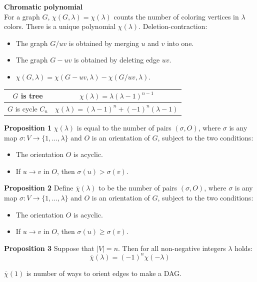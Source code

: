 \textbf{\large{Chromatic polynomial}}\\
For a graph $G$, $\chi(G, \lambda) = \chi(\lambda)$ counts the number of coloring vertices in $\lambda$ colors.
There is a unique polynomial $\chi(\lambda)$. Deletion-contraction:
\begin{itemize}
\item The graph $G/uv$ is obtained by merging $u$ and $v$ into one. 
\item The graph $G - uv$ is obtained by deleting edge $uv$.
\item $\chi(G, \lambda) = \chi(G - uv, \lambda) - \chi(G/uv, \lambda)$. 
\end{itemize}

\begin{tabular}{|c|c|}
\hline
$G$ is tree & $\chi(\lambda) = \lambda(\lambda - 1)^{n - 1}$ \\
\hline
$G$ is cycle $C_n$ & $\chi(\lambda) = (\lambda - 1)^n + (-1)^n(\lambda - 1)$\\
\hline
\end{tabular} 
 
\textbf{Proposition 1} $\chi(\lambda)$ is equal to the number of pairs $(\sigma, O)$, 
where $\sigma$ is any map $\sigma : V \rightarrow \{1, \dots, \lambda\}$ and $O$ is an orientation of $G$, 
subject to the two conditions:
\begin{itemize}
\item The orientation $O$ is acyclic.
\item If $u \rightarrow v$ in $O$, then $\sigma (u) > \sigma (v)$.
\end{itemize}

\textbf{Proposition 2} Define $\overline{\chi}(\lambda)$ to be the number of pairs $(\sigma, O)$, 
where $\sigma$ is any map $\sigma : V \rightarrow \{1, \dots, \lambda\}$ and $O$ is an orientation of $G$, 
subject to the two conditions:
\begin{itemize}
\item The orientation $O$ is acyclic.
\item If $u \rightarrow v$ in $O$, then $\sigma (u) \ge \sigma (v)$.
\end{itemize}

\textbf{Proposition 3} Suppose that $|V| = n$. Then for all non-negative integers $\lambda$ holds:
$$\overline{\chi}(\lambda) = (-1)^n \chi(-\lambda)$$


$\overline{\chi}(1)$ is number of ways to orient edges to make a DAG.



